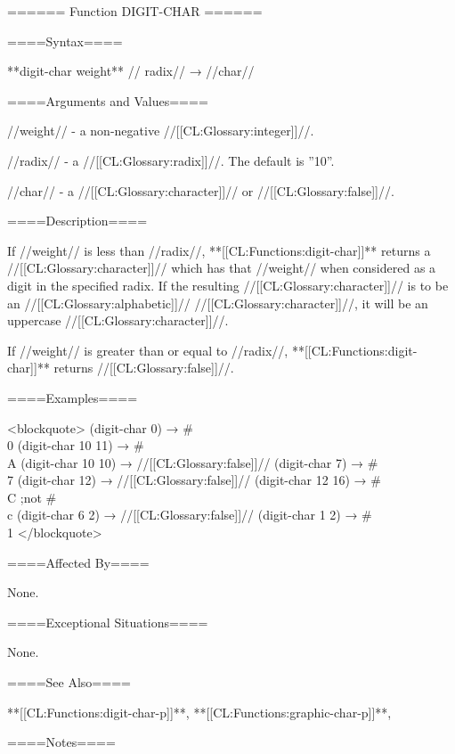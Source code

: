 ====== Function DIGIT-CHAR ======

====Syntax====

**digit-char {weight** //\opt} radix// → //char//

====Arguments and Values====

//weight// - a non-negative //[[CL:Glossary:integer]]//.

//radix// - a //[[CL:Glossary:radix]]//. The default is ''10''.

//char// - a //[[CL:Glossary:character]]// or //[[CL:Glossary:false]]//.

====Description====

If //weight// is less than //radix//, **[[CL:Functions:digit-char]]** returns a //[[CL:Glossary:character]]// which has that //weight// when considered as a digit in the specified radix. If the resulting //[[CL:Glossary:character]]// is to be an //[[CL:Glossary:alphabetic]]// //[[CL:Glossary:character]]//, it will be an uppercase //[[CL:Glossary:character]]//.

If //weight// is greater than or equal to //radix//, **[[CL:Functions:digit-char]]** returns //[[CL:Glossary:false]]//.

====Examples====

<blockquote> (digit-char 0) → #\\0 (digit-char 10 11) → #\\A (digit-char 10 10) → //[[CL:Glossary:false]]// (digit-char 7) → #\\7 (digit-char 12) → //[[CL:Glossary:false]]// (digit-char 12 16) → #\\C ;not #\\c (digit-char 6 2) → //[[CL:Glossary:false]]// (digit-char 1 2) → #\\1 </blockquote>

====Affected By====

None.

====Exceptional Situations====

None.

====See Also====

**[[CL:Functions:digit-char-p]]**, **[[CL:Functions:graphic-char-p]]**, {\secref\CharacterSyntax}

====Notes====

